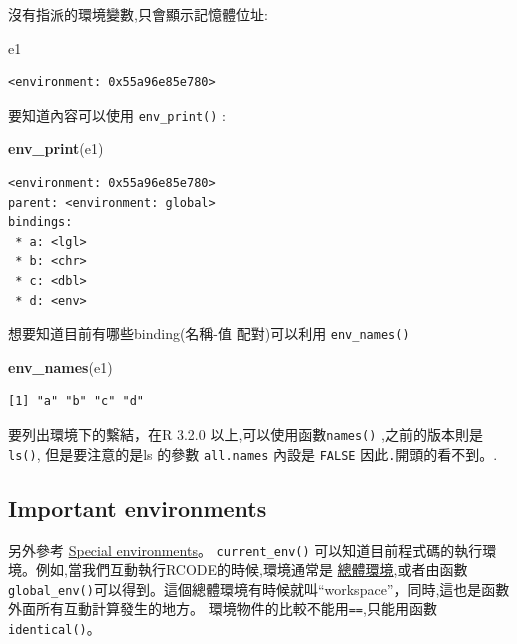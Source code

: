 \documentclass[]{book}
\newenvironment{Shaded}{\begin{snugshade}}{\end{snugshade}}
\newcommand{\KeywordTok}[1]{\textcolor[rgb]{0.13,0.29,0.53}{\textbf{#1}}}
\newcommand{\NormalTok}[1]{#1}
\theoremstyle{definition}
\theoremstyle{definition}
\theoremstyle{definition}
\theoremstyle{remark}
\begin{document}
沒有指派的環境變數,只會顯示記憶體位址:

\begin{Shaded}
\begin{Highlighting}[]
\NormalTok{e1}
\end{Highlighting}
\end{Shaded}

\begin{verbatim}
<environment: 0x55a96e85e780>
\end{verbatim}

要知道內容可以使用 \texttt{env\_print()} :

\begin{Shaded}
\begin{Highlighting}[]
\KeywordTok{env_print}\NormalTok{(e1)}
\end{Highlighting}
\end{Shaded}

\begin{verbatim}
<environment: 0x55a96e85e780>
parent: <environment: global>
bindings:
 * a: <lgl>
 * b: <chr>
 * c: <dbl>
 * d: <env>
\end{verbatim}

想要知道目前有哪些binding(名稱-值 配對)可以利用 \texttt{env\_names()}

\begin{Shaded}
\begin{Highlighting}[]
\KeywordTok{env_names}\NormalTok{(e1)}
\end{Highlighting}
\end{Shaded}

\begin{verbatim}
[1] "a" "b" "c" "d"
\end{verbatim}

要列出環境下的繫結，在R 3.2.0 以上,可以使用函數\texttt{names()}
,之前的版本則是 \texttt{ls()}, 但是要注意的是ls 的參數
\texttt{all.names} 內設是 \texttt{FALSE} 因此\texttt{.}開頭的看不到。.

\hypertarget{important-environments}{%
\subsection{Important environments}\label{important-environments}}

另外參考 \protect\hyperlink{function-envs}{Special environments}。
\texttt{current\_env()}
可以知道目前程式碼的執行環境。例如,當我們互動執行RCODE的時候,環境通常是
\protect\hyperlink{globalux5cux2520environment}{總體環境},或者由函數\texttt{global\_env()}可以得到。這個總體環境有時候就叫``workspace''，同時,這也是函數外面所有互動計算發生的地方。
環境物件的比較不能用\texttt{==},只能用函數\texttt{identical()}。
\end{document}
